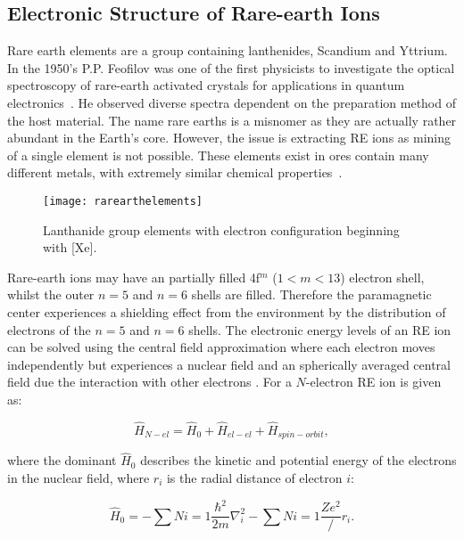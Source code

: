 
 
\subsection{Electronic Structure of Rare-earth Ions}


Rare earth elements are a group containing lanthenides, Scandium and Yttrium. In the 1950's P.P. Feofilov was one of the first physicists to investigate the optical spectroscopy of rare-earth activated crystals for applications in quantum electronics~\citep{MALKIN198713}. He observed diverse spectra dependent on the preparation method of the host material. The name rare earths is a misnomer as they are actually rather abundant in the Earth's core. However, the issue is extracting RE ions as mining of a single element is not possible. These elements exist in ores contain many different metals, with extremely similar chemical properties~\citep{benelli2015introduction}.  
   

\begin{figure}[h]
\centering
\texttt{[image: rarearthelements]}
\caption{\label{fig:YSOstructure}Lanthanide group elements with electron configuration beginning with [Xe].}
\end{figure}


Rare-earth ions may have an partially filled 4f$^{m}$ ($1 < m < 13$) electron shell, whilst the outer $n = 5$ and $n = 6$ shells are filled. Therefore the paramagnetic center experiences a shielding effect from the environment by the distribution of electrons of the $n = 5$ and $n = 6$ shells. The electronic energy levels of an RE ion can be solved using the central field approximation where each electron moves independently but experiences a nuclear field and an spherically averaged central field due the interaction with other electrons \citep{liu2006spectroscopic}. For a $N$-electron RE ion is given as:

\begin{equation}
\label{eq:freeionHamiltonian}
\hat{H}_{N-el} = \hat{H}_{0} + \hat{H}_{el-el} + \hat{H}_{spin-orbit},
\end{equation} 

\noindent where the dominant $\hat{H}_{0}$ describes the kinetic and potential energy of the electrons in the nuclear field, where $r_{i}$ is the radial distance of electron $i$: 

\begin{equation}
\label{eq:H0}
\hat{H}_{0} = -\sum{N}{i=1} \frac{\hbar^{2}}{2m} \nabla_{i}^{2} - \sum{N}{i=1}\frac{Ze^{2}}/r_{i}. 
\end{equation} 


